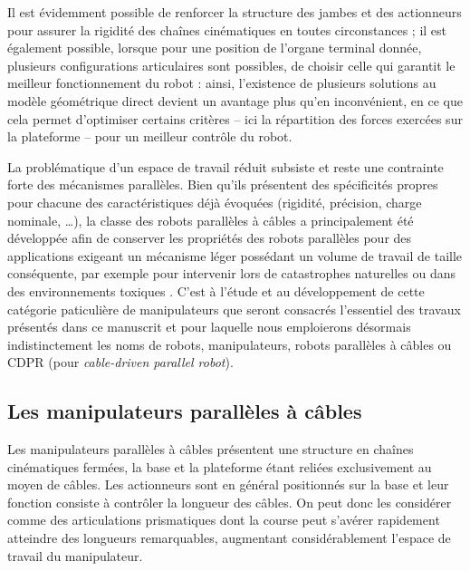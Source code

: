 Il est évidemment possible de renforcer la structure des jambes et des actionneurs pour assurer la rigidité des chaînes cinématiques en toutes circonstances ; il est également possible, lorsque pour une position de l'organe terminal donnée, plusieurs configurations articulaires sont possibles, de choisir celle qui garantit le meilleur fonctionnement du robot \cite{2002:Verhoeven.Miller} : ainsi, l'existence de plusieurs solutions au modèle géométrique direct devient un avantage plus qu'en inconvénient, en ce que cela permet d'optimiser certains critères -- ici la répartition des forces exercées sur la plateforme -- pour un meilleur contrôle du robot.

La problématique d'un espace de travail réduit subsiste et reste une contrainte forte des mécanismes parallèles. Bien qu'ils présentent des spécificités propres pour chacune des caractéristiques déjà évoquées (rigidité, précision, charge nominale, \dots), la classe des robots parallèles à câbles a principalement été développée afin de conserver les propriétés des robots parallèles pour des applications exigeant un mécanisme léger possédant un volume de travail de taille conséquente, par exemple pour intervenir lors de catastrophes naturelles ou dans des environnements toxiques \cite{1992:Albus.Bostelman.ea}. C'est à l'étude et au développement de cette catégorie paticulière de manipulateurs que seront consacrés l'essentiel des travaux présentés dans ce manuscrit et pour laquelle nous emploierons désormais indistinctement les noms de robots, manipulateurs, robots parallèles à câbles ou CDPR (pour {\it cable-driven parallel robot}).

\subsection{Les manipulateurs parallèles à câbles}

Les manipulateurs parallèles à câbles présentent une structure en chaînes cinéma\-tiques fermées, la base et la plateforme étant reliées exclusivement au moyen de câbles. Les actionneurs sont en général positionnés sur la base et leur fonction consiste à contrôler la longueur des câbles. On peut donc les considérer comme des articulations prismatiques dont la course peut s'avérer rapidement atteindre des longueurs remarquables, augmentant considérablement l'espace de travail du manipulateur.

